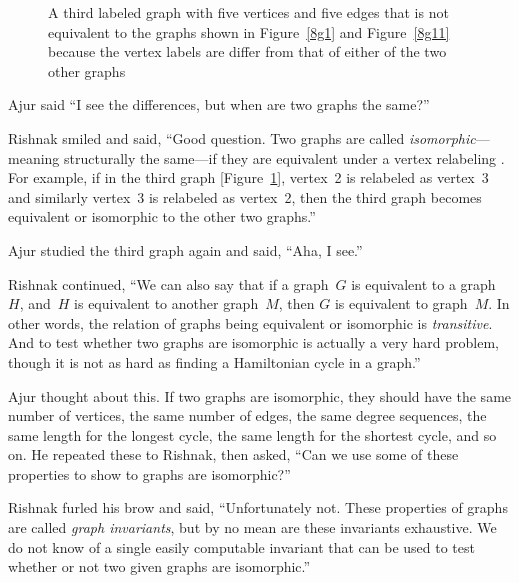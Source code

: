 \begin{figure}
\begin{center}
\caption{A third labeled graph with five vertices and five edges that is not equivalent to the graphs shown in Figure~\ref{8g1} and Figure~\ref{8g11} because the vertex labels are differ from that of either of the two other graphs}\label{8g2}
\end{center}
\end{figure}

Ajur said ``I see the differences, but when are two graphs the same?''

Rishnak smiled and said, ``Good question. Two graphs are called \textit{isomorphic}---meaning structurally the same---if they are equivalent under a vertex relabeling . For example, if in the third graph [Figure~\ref{8g2}], vertex~2 is relabeled as vertex~3 and similarly vertex~3 is relabeled as vertex~2, then the third graph becomes equivalent or isomorphic to the other two graphs.''

Ajur studied the third graph again and said, ``Aha, I see.''

Rishnak continued, ``We can also say that if a graph~$G$ is equivalent to a graph~$H$, and~$H$ is equivalent to another graph~$M$, then $G$ is equivalent to graph~$M$. In other words, the relation of graphs being  equivalent or isomorphic is \textit{transitive}. And to test whether two graphs are isomorphic is actually a very hard problem, though it is not as hard as finding a Hamiltonian cycle in a graph.''

Ajur thought about this. If two graphs are isomorphic, they should have the same number of vertices, the same number of edges, the same degree sequences, the same length for the longest cycle, the same length for the shortest cycle, and so on. He repeated these to Rishnak, then asked, ``Can we use some of these properties to show to graphs are isomorphic?''

Rishnak furled his brow and said, ``Unfortunately not. These properties of graphs are called \textit{graph invariants}, but by no mean are these invariants exhaustive. We do not know of a single easily computable invariant that can be used to test whether or not two given graphs are isomorphic.''

